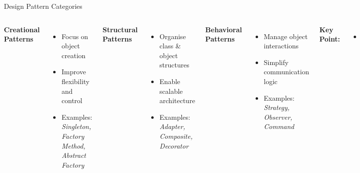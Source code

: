 \documentclass[aspectratio=169, table]{beamer}
\begin{document}
\begin{frame}[fragile]{Design Pattern Categories}
\vspace{10pt}
\begin{columns}[T]
\textbf{Creational Patterns}
\begin{itemize}
\item Focus on object creation
\item Improve flexibility and control
\item Examples:
\textit{Singleton, Factory Method, Abstract Factory}
\end{itemize}

\textbf{Structural Patterns}
\begin{itemize}
\item Organise class \& object structures
\item Enable scalable architecture
\item Examples:
\textit{Adapter, Composite, Decorator}
\end{itemize}

\textbf{Behavioral Patterns}
\begin{itemize}
\item Manage object interactions
\item Simplify communication logic
\item Examples:
\textit{Strategy, Observer, Command}
\end{itemize}

\textbf{Key Point:}
\begin{itemize}
\item Categories reflect intent:
creation, structure, and behaviour
\end{itemize}
\end{columns}
\end{frame}
\end{document}
